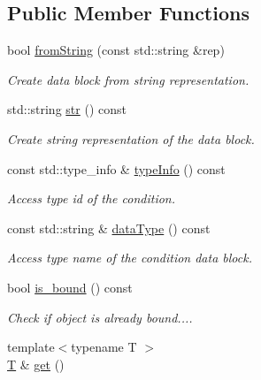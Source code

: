 \subsection*{Public Member Functions}
\begin{DoxyCompactItemize}
\item 
bool \hyperlink{class_d_d4hep_1_1_opaque_data_a356cc2bf1722ae6738c584730046ce5a}{fromString} (const std::string \&rep)
\begin{DoxyCompactList}\small\item\em Create data block from string representation. \item\end{DoxyCompactList}\item 
std::string \hyperlink{class_d_d4hep_1_1_opaque_data_ae6b9e39bcf528eb264e350406792470e}{str} () const 
\begin{DoxyCompactList}\small\item\em Create string representation of the data block. \item\end{DoxyCompactList}\item 
const std::type\_\-info \& \hyperlink{class_d_d4hep_1_1_opaque_data_a5abca451748e71fa1147402f6498679c}{typeInfo} () const 
\begin{DoxyCompactList}\small\item\em Access type id of the condition. \item\end{DoxyCompactList}\item 
const std::string \& \hyperlink{class_d_d4hep_1_1_opaque_data_ac6eab785c37e098f09b1861e00a9e919}{dataType} () const 
\begin{DoxyCompactList}\small\item\em Access type name of the condition data block. \item\end{DoxyCompactList}\item 
bool \hyperlink{class_d_d4hep_1_1_opaque_data_a1898df776b793f7d0928a1756137cd1c}{is\_\-bound} () const 
\begin{DoxyCompactList}\small\item\em Check if object is already bound.... \item\end{DoxyCompactList}\item 
{\footnotesize template$<$typename T $>$ }\\\hyperlink{class_t}{T} \& \hyperlink{class_d_d4hep_1_1_opaque_data_aab4604ebb0ec5b4de22b84c3b3489ca6}{get} ()

\end{DoxyCompactItemize}
